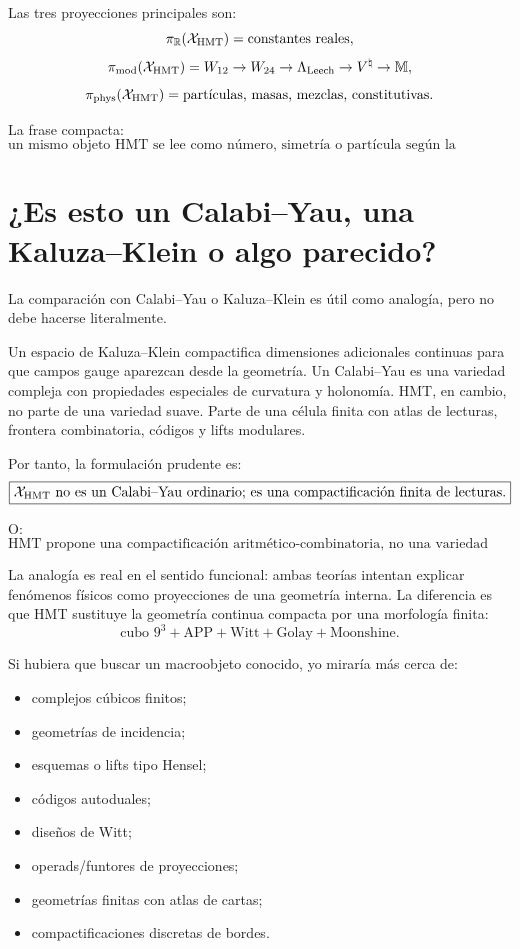 \documentclass[11pt,a4paper]{article}
\theoremstyle{definition}
\theoremstyle{remark}
\newcommand{\Leech}{\Lambda_{\mathrm{Leech}}}
\newcommand{\Vnat}{V^{\natural}}
\newcommand{\Monster}{\mathbb M}
\begin{document}
Las tres proyecciones principales son:
\[
\pi_{\mathbb R}(\mathcal X_{\rm HMT})=\text{constantes reales},
\]
\[
\pi_{\rm mod}(\mathcal X_{\rm HMT})=W_{12}\to W_{24}\to\Leech\to\Vnat\to\Monster,
\]
\[
\pi_{\rm phys}(\mathcal X_{\rm HMT})=\text{partículas, masas, mezclas, constitutivas}.
\]

La frase compacta:
\[
\boxed{
\text{un mismo objeto HMT se lee como número, simetría o partícula según la proyección.}
}
\]

\section{¿Es esto un Calabi--Yau, una Kaluza--Klein o algo parecido?}

La comparación con Calabi--Yau o Kaluza--Klein es útil como analogía, pero no debe hacerse literalmente.

Un espacio de Kaluza--Klein compactifica dimensiones adicionales continuas para que campos gauge aparezcan desde la geometría. Un Calabi--Yau es una variedad compleja con propiedades especiales de curvatura y holonomía. HMT, en cambio, no parte de una variedad suave. Parte de una célula finita con atlas de lecturas, frontera combinatoria, códigos y lifts modulares.

Por tanto, la formulación prudente es:
\[
\boxed{
\mathcal X_{\rm HMT}\text{ no es un Calabi--Yau ordinario; es una compactificación finita de lecturas.}
}
\]

O:
\[
\boxed{
\text{HMT propone una compactificación aritmético-combinatoria, no una variedad suave primaria.}
}
\]

La analogía es real en el sentido funcional: ambas teorías intentan explicar fenómenos físicos como proyecciones de una geometría interna. La diferencia es que HMT sustituye la geometría continua compacta por una morfología finita:
\[
\text{cubo }9^3+\text{APP}+\text{Witt}+\text{Golay}+\text{Moonshine}.
\]

Si hubiera que buscar un macroobjeto conocido, yo miraría más cerca de:
\begin{itemize}[leftmargin=2em]
\item complejos cúbicos finitos;
\item geometrías de incidencia;
\item esquemas o lifts tipo Hensel;
\item códigos autoduales;
\item diseños de Witt;
\item operads/funtores de proyecciones;
\item geometrías finitas con atlas de cartas;
\item compactificaciones discretas de bordes.
\end{itemize}
\end{document}
